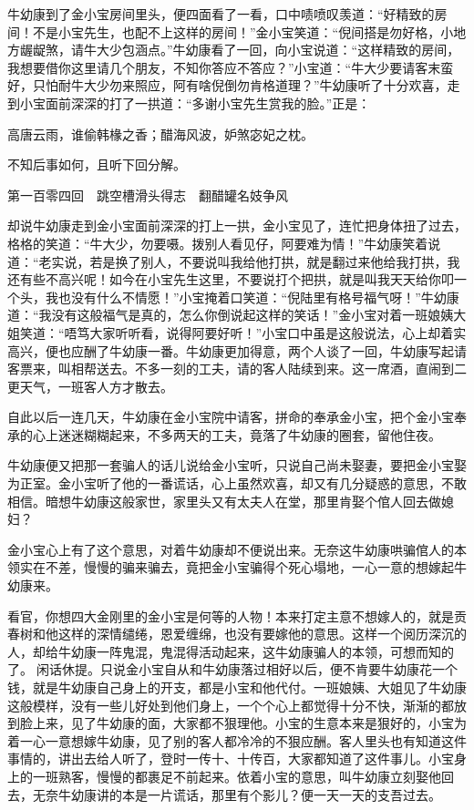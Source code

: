 \documentclass[12pt,UTF8]{ctexbook}
\begin{document}
{{{牛幼康到了金小宝房间里头，便四面看了一看，口中啧喷叹羡道：“好精致的房间！不是小宝先生，也配不上这样的房间！”金小宝笑道：“倪间搭是勿好格，小地方龌龊煞，请牛大少包涵点。”牛幼康看了一回，向小宝说道：“这样精致的房间，我想要借你这里请几个朋友，不知你答应不答应？”小宝道：“牛大少要请客末蛮好，只怕耐牛大少勿来照应，阿有啥倪倒勿肯格道理？”牛幼康听了十分欢喜，走到小宝面前深深的打了一拱道：“多谢小宝先生赏我的脸。”正是：

高唐云雨，谁偷韩椽之香；醋海风波，妒煞宓妃之枕。

不知后事如何，且听下回分解。





第一百零四回　跳空槽滑头得志　翻醋罐名妓争风



却说牛幼康走到金小宝面前深深的打上一拱，金小宝见了，连忙把身体扭了过去，格格的笑道：“牛大少，勿要嗫。拨别人看见仔，阿要难为情！”牛幼康笑着说道：“老实说，若是换了别人，不要说叫我给他打拱，就是翻过来他给我打拱，我还有些不高兴呢！如今在小宝先生这里，不要说打个把拱，就是叫我天天给你叩一个头，我也没有什么不情愿！”小宝掩着口笑道：“倪陆里有格号福气呀！”牛幼康道：“我没有这般福气是真的，怎么你倒说起这样的笑话！”金小宝对着一班娘姨大姐笑道：“唔笃大家听听看，说得阿要好听！”小宝口中虽是这般说法，心上却着实高兴，便也应酬了牛幼康一番。牛幼康更加得意，两个人谈了一回，牛幼康写起请客票来，叫相帮送去。不多一刻的工夫，请的客人陆续到来。这一席酒，直闹到二更天气，一班客人方才散去。

自此以后一连几天，牛幼康在金小宝院中请客，拼命的奉承金小宝，把个金小宝奉承的心上迷迷糊糊起来，不多两天的工夫，竟落了牛幼康的圈套，留他住夜。

牛幼康便又把那一套骗人的话儿说给金小宝听，只说自己尚未娶妻，要把金小宝娶为正室。金小宝听了他的一番谎话，心上虽然欢喜，却又有几分疑惑的意思，不敢相信。暗想牛幼康这般家世，家里头又有太夫人在堂，那里肯娶个倌人回去做媳妇？

金小宝心上有了这个意思，对着牛幼康却不便说出来。无奈这牛幼康哄骗倌人的本领实在不差，慢慢的骗来骗去，竟把金小宝骗得个死心塌地，一心一意的想嫁起牛幼康来。

看官，你想四大金刚里的金小宝是何等的人物！本来打定主意不想嫁人的，就是贡春树和他这样的深情缱绻，恩爱缠绵，也没有要嫁他的意思。这样一个阅历深沉的人，却给牛幼康一阵鬼混，鬼混得活动起来，这牛幼康骗人的本领，可想而知的了。闲话休提。只说金小宝自从和牛幼康落过相好以后，便不肯要牛幼康花一个钱，就是牛幼康自己身上的开支，都是小宝和他代付。一班娘姨、大姐见了牛幼康这般模样，没有一些儿好处到他们身上，一个个心上都觉得十分不快，渐渐的都放到脸上来，见了牛幼康的面，大家都不狠理他。小宝的生意本来是狠好的，小宝为着一心一意想嫁牛幼康，见了别的客人都冷冷的不狠应酬。客人里头也有知道这件事情的，讲出去给人听了，登时一传十、十传百，大家都知道了这件事儿。小宝身上的一班熟客，慢慢的都裹足不前起来。依着小宝的意思，叫牛幼康立刻娶他回去，无奈牛幼康讲的本是一片谎话，那里有个影儿？便一天一天的支吾过去。

}}}
\end{document}
